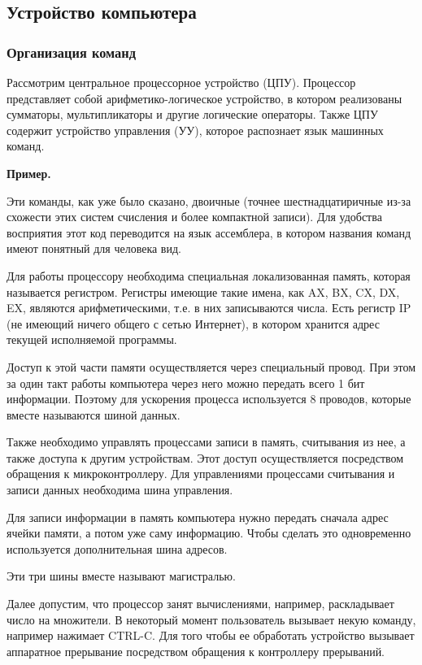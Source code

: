 \documentclass[a4paper, fleqn]{article}
\newenvironment{example}[1][]{\medskip \noindent \textbf{Пример. #1}\par \nopagebreak}{\medskip \par} %
\begin{document}
		\subsection*{Устройство компьютера}
		
		\subsubsection*{Организация команд}
		
			Рассмотрим центральное процессорное устройство (ЦПУ). Процессор представляет собой арифметико-логическое устройство, в котором реализованы сумматоры, мультипликаторы и другие логические операторы. Также ЦПУ содержит устройство управления (УУ), которое распознает язык машинных команд.
			
			\begin{example}
				Эти команды, как уже было сказано, двоичные (точнее шестнадцатиричные из-за схожести этих систем счисления и более компактной записи).
				Для удобства восприятия этот код переводится на язык ассемблера, в котором названия команд имеют понятный для человека вид.
			\end{example}
			
			Для работы процессору необходима специальная локализованная память, которая называется регистром. Регистры имеющие такие имена, как AX, BX, CX, DX, EX, являются арифметическими, т.е. в них записываются числа. Есть регистр IP (не имеющий ничего общего с сетью Интернет), в котором хранится адрес текущей исполняемой программы. 
			
			Доступ к этой части памяти осуществляется через специальный провод. При этом за один такт работы компьютера через него можно передать всего 1 бит информации. Поэтому для ускорения процесса используется 8 проводов, которые вместе называются шиной данных.
			
			Также необходимо управлять процессами записи в память, считывания из нее, а также доступа к другим устройствам. Этот доступ осуществляется посредством обращения к микроконтроллеру. Для управлениями процессами считывания и записи данных необходима шина управления. 
			
			Для записи информации в память компьютера нужно передать сначала адрес ячейки памяти, а потом уже саму информацию. Чтобы сделать это одновременно используется дополнительная шина адресов. 
			
			Эти три шины вместе называют магистралью. 
			
			Далее допустим, что процессор занят вычислениями, например, раскладывает число на множители. В некоторый момент пользователь вызывает некую команду, например нажимает CTRL-C. Для того чтобы ее обработать устройство вызывает аппаратное прерывание посредством обращения к контроллеру прерываний. 
			
\end{document}
